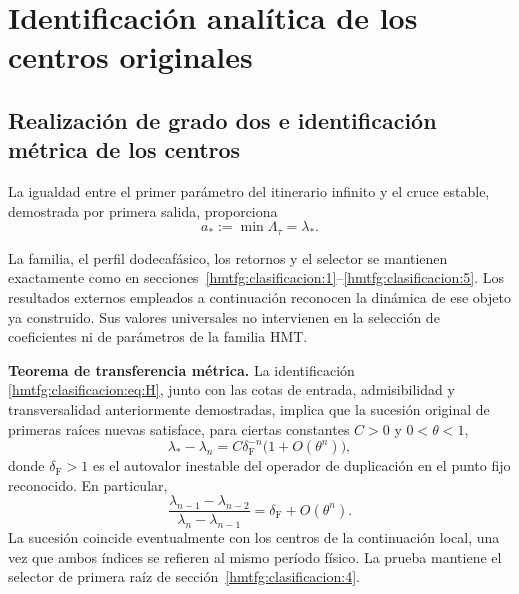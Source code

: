 \section{Identificación analítica de los centros originales}
\label{hmtfg:fragmento:identificacion-analitica-de-los-centros-originales}

\subsection{Realización de grado dos e identificación métrica de los centros}
\label{hmtfg:clasificacion:8}

La igualdad entre el primer parámetro del itinerario infinito y el cruce estable, demostrada por primera salida, proporciona
\begin{equation}
\boxed{a_*:=\min\Lambda_\tau=\lambda_*.}
\label{hmtfg:clasificacion:eq:H}
\end{equation}

La familia, el perfil dodecafásico, los retornos y el selector se mantienen exactamente como en secciones~\ref{hmtfg:clasificacion:1}--\ref{hmtfg:clasificacion:5}. Los resultados externos empleados a continuación reconocen la dinámica de ese objeto ya construido. Sus valores universales no intervienen en la selección de coeficientes ni de parámetros de la familia HMT.

\textbf{Teorema de transferencia métrica.} La identificación \eqref{hmtfg:clasificacion:eq:H}, junto con las cotas de entrada, admisibilidad y transversalidad anteriormente demostradas, implica que la sucesión original de primeras raíces nuevas satisface, para ciertas constantes \(C>0\) y \(0<\theta<1\),
\begin{equation}
\boxed{\lambda_*-\lambda_n=C\delta_{\mathrm F}^{-n}
\bigl(1+O(\theta^n)\bigr),}
\label{hmtfg:clasificacion:eq:14}
\end{equation}
donde \(\delta_{\mathrm F}>1\) es el autovalor inestable del operador de duplicación en el punto fijo reconocido. En particular,
\begin{equation}
\frac{\lambda_{n-1}-\lambda_{n-2}}
     {\lambda_n-\lambda_{n-1}}
=\delta_{\mathrm F}+O(\theta^n).
\label{hmtfg:clasificacion:eq:15}
\end{equation}
La sucesión coincide eventualmente con los centros de la continuación local, una vez que ambos índices se refieren al mismo período físico. La prueba mantiene el selector de primera raíz de sección~\ref{hmtfg:clasificacion:4}.

